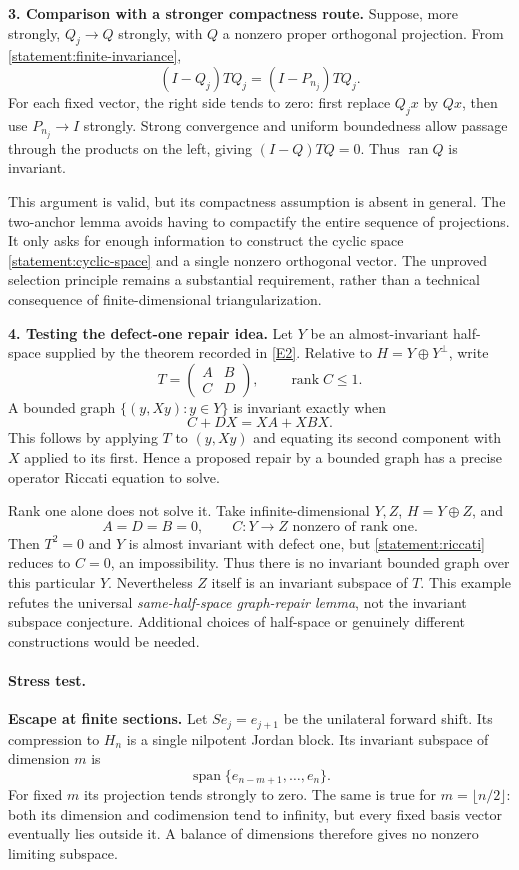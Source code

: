 \documentclass[11pt,a4paper]{article}
\newcommand{\eref}[2]{\hyperlink{extra:#1:#2}{[E#2]}}
\numberwithin{equation}{section}
\begin{document}
\medskip
\textbf{3. Comparison with a stronger compactness route.}
Suppose, more strongly, $Q_j\to Q$ strongly, with $Q$ a nonzero proper
orthogonal projection. From \eqref{statement:finite-invariance},
\[
 (I-Q_j)TQ_j=(I-P_{n_j})TQ_j.
\]
For each fixed vector, the right side tends to zero: first replace $Q_jx$
by $Qx$, then use $P_{n_j}\to I$ strongly. Strong convergence and uniform
boundedness allow passage through the products on the left, giving
$(I-Q)TQ=0$. Thus $\operatorname{ran}Q$ is invariant.

This argument is valid, but its compactness assumption is absent in general.
The two-anchor lemma avoids having to compactify the entire sequence of
projections. It only asks for enough information to construct the cyclic
space \eqref{statement:cyclic-space} and a single nonzero orthogonal vector.
The unproved selection principle remains a substantial requirement, rather
than a technical consequence of finite-dimensional triangularization.

\medskip
\textbf{4. Testing the defect-one repair idea.}
Let $Y$ be an almost-invariant half-space supplied by the theorem recorded
in \eref{statement}{2}. Relative to $H=Y\oplus Y^\perp$, write
\[
 T=\begin{pmatrix}A&B\\ C&D\end{pmatrix},\qquad\operatorname{rank}C\leq1.
\]
A bounded graph $\{(y,Xy):y\in Y\}$ is invariant exactly when
\begin{equation}\label{statement:riccati}
 C+DX=XA+XBX.
\end{equation}
This follows by applying $T$ to $(y,Xy)$ and equating its second component
with $X$ applied to its first. Hence a proposed repair by a bounded graph
has a precise operator Riccati equation to solve.

Rank one alone does not solve it. Take infinite-dimensional $Y,Z$,
$H=Y\oplus Z$, and
\[
 A=D=B=0,\qquad C:Y\to Z\text{ nonzero of rank one}.
\]
Then $T^2=0$ and $Y$ is almost invariant with defect one, but
\eqref{statement:riccati} reduces to $C=0$, an impossibility. Thus there is no
invariant bounded graph over this particular $Y$. Nevertheless $Z$ itself
is an invariant subspace of $T$. This example refutes the universal
\emph{same-half-space graph-repair lemma}, not the invariant subspace
conjecture. Additional choices of half-space or genuinely different
constructions would be needed.

\paragraph{Stress test.}
\textbf{Escape at finite sections.}
Let $S e_j=e_{j+1}$ be the unilateral forward shift. Its compression to $H_n$
is a single nilpotent Jordan block. Its invariant subspace of dimension $m$
is
\[
 \operatorname{span}\{e_{n-m+1},\ldots,e_n\}.
\]
For fixed $m$ its projection tends strongly to zero. The same is true for
$m=\lfloor n/2\rfloor$: both its dimension and codimension tend to infinity,
but every fixed basis vector eventually lies outside it. A balance of
dimensions therefore gives no nonzero limiting subspace.
\end{document}
